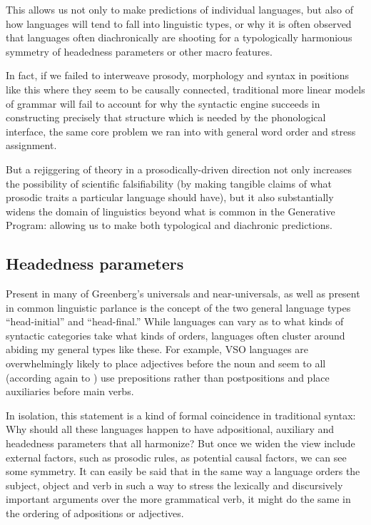 \documentclass{article}
\begin{document}
This allows us not only to make predictions of individual languages, but also of how languages will tend to fall into linguistic types, or why it is often observed that languages often diachronically are shooting for a typologically harmonious symmetry of headedness parameters or other macro features.

In fact, if we failed to interweave prosody, morphology and syntax in positions like this where they seem to be causally connected, traditional more linear models of grammar will fail to account for why the syntactic engine succeeds in constructing precisely that structure which is needed by the phonological interface, the same core problem we ran into with general word order and stress assignment.

But a rejiggering of theory in a prosodically-driven direction not only increases the possibility of scientific falsifiability (by making tangible claims of what prosodic traits a particular language should have), but it also substantially widens the domain of linguistics beyond what is common in the Generative Program: allowing us to make both typological and diachronic predictions.

\subsection{Headedness parameters}

Present in many of Greenberg's universals and near-universals, as well as present in common linguistic parlance is the concept of the two general language types ``head-initial'' and ``head-final.''
While languages can vary as to what kinds of syntactic categories take what kinds of orders, languages often cluster around abiding my general types like these.
For example, VSO languages are overwhelmingly likely to place adjectives before the noun and seem to all (according again to \textcite{greenberg63}) use prepositions rather than postpositions and place auxiliaries before main verbs.

In isolation, this statement is a kind of formal coincidence in traditional syntax: Why should all these languages happen to have adpositional, auxiliary and headedness parameters that all harmonize? But once we widen the view include external factors, such as prosodic rules, as potential causal factors, we can see some symmetry.
It can easily be said that in the same way a language orders the subject, object and verb in such a way to stress the lexically and discursively important arguments over the more grammatical verb, it might do the same in the ordering of adpositions or adjectives.
\end{document}
